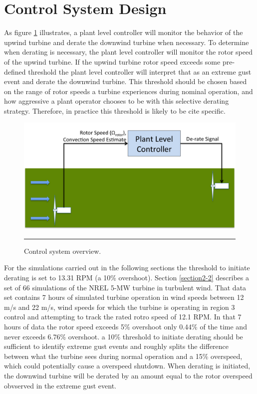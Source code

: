 \section{Control System Design} \label{section4-5}

As figure \ref{fig4-20} illustrates, a plant level controller will monitor the behavior of the upwind turbine and derate the downwind turbine when necessary. To determine when derating is necessary, the plant level controller will monitor the rotor speed of the upwind turbine. If the upwind turbine rotor speed exceeds some pre-defined threshold the plant level controller will interpret that as an extreme gust event and derate the downwind turbine. This threshold should be chosen based on the range of rotor speeds a turbine experiences during nominal operation, and how aggressive a plant operator chooses to be with this selective derating strategy. Therefore, in practice this threshold is likely to be cite specific. 

\begin{figure}[htbp]
	\centering
		\includegraphics[width = \linewidth]{Figures/ch4Figures/fig4-20.png}
		\rule{35em}{0.5pt}
	\caption{Control system overview.}
	\label{fig4-20}
\end{figure}


For the simulations carried out in the following sections the threshold to initiate derating is set to 13.31 RPM (a 10\% overshoot). Section \ref{section2-2} describes a set of 66 simulations of the NREL 5-MW turbine in turbulent wind. That data set contains 7 hours of simulated turbine operation in wind speeds between 12 m/s and 22 m/s, wind speeds for which the turbine is operating in region 3 control and attempting to track the rated rotro speed of 12.1 RPM. In that 7 hours of data the rotor speed exceeds 5\% overshoot only 0.44\% of the time and never exceeds 6.76\% overshoot. a 10\% threshold to initiate derating should be sufficient to identify extreme gust events and roughly splits the difference between what the turbine sees during normal operation and a 15\% overspeed, which could potentially cause a overspeed shutdown. When derating is initiated, the downwind turbine will be derated by an amount equal to the rotor overspeed obvserved in the extreme gust event. 

